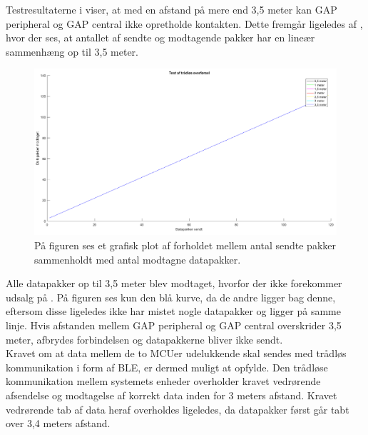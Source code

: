 Testresultaterne i  viser, at med en afstand på mere end 3,5 meter kan GAP peripheral og GAP central ikke opretholde kontakten. Dette fremgår ligeledes af , hvor der ses, at antallet af sendte og modtagende pakker har en lineær sammenhæng op til 3,5 meter.
\begin{figure}[H]
	\centering
	\includegraphics[scale=0.45]{figures/cDesign/test_ble.png}
	\caption{På figuren ses et grafisk plot af forholdet mellem antal sendte pakker sammenholdt med antal modtagne datapakker. }
	\label{fig:test_ble}
\end{figure}
Alle datapakker op til 3,5 meter blev modtaget, hvorfor der ikke forekommer udsalg på . På figuren ses kun den blå kurve, da de andre ligger bag denne, eftersom disse ligeledes ikke har mistet nogle datapakker og ligger på samme linje. Hvis afstanden mellem GAP peripheral og GAP central overskrider 3,5 meter, afbrydes forbindelsen og datapakkerne bliver ikke sendt. \\
Kravet om at data mellem de to MCUer udelukkende skal sendes med trådløs kommunikation i form af BLE, er dermed muligt at opfylde. Den trådløse kommunikation mellem systemets enheder overholder kravet vedrørende afsendelse og modtagelse af korrekt data inden for 3 meters afstand. Kravet vedrørende tab af data heraf overholdes ligeledes, da datapakker først går tabt over 3,4 meters afstand.
